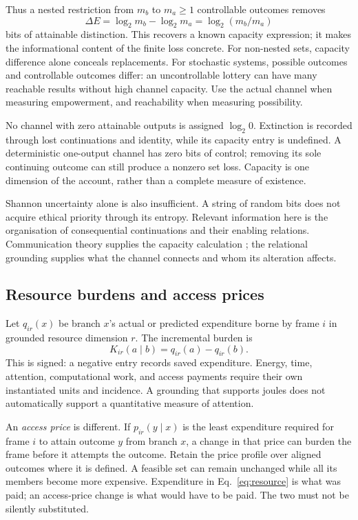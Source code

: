 \documentclass[11pt,a4paper]{article}
\theoremstyle{remark}
\begin{document}
Thus a nested restriction from $m_b$ to $m_a\geq1$ controllable outcomes removes
\begin{equation}\label{eq:bitloss}
\Delta E=\log_2m_b-\log_2m_a=\log_2(m_b/m_a)
\end{equation}
bits of attainable distinction. This recovers a known capacity expression; it
makes the informational content of the finite loss concrete. For non-nested
sets, capacity difference alone conceals replacements. For stochastic systems,
possible outcomes and controllable outcomes differ: an uncontrollable lottery
can have many reachable results without high channel capacity. Use the actual
channel when measuring empowerment, and reachability when measuring possibility.

No channel with zero attainable outputs is assigned $\log_2 0$. Extinction is
recorded through lost continuations and identity, while its capacity entry is
undefined. A deterministic one-output channel has zero bits of control; removing
its sole continuing outcome can still produce a nonzero set loss. Capacity is
one dimension of the account, rather than a complete measure of existence.

Shannon uncertainty alone is also insufficient. A string of random bits does
not acquire ethical priority through its entropy. Relevant information here is
the organisation of consequential continuations and their enabling relations.
Communication theory supplies the capacity calculation
\citep{shannon1948communication}; the relational grounding supplies what the
channel connects and whom its alteration affects.

\subsection{Resource burdens and access prices}

Let $q_{ir}(x)$ be branch $x$'s actual or predicted expenditure borne by frame
$i$ in grounded resource dimension $r$. The incremental burden is
\begin{equation}\label{eq:resource}
K_{ir}(a\mid b)=q_{ir}(a)-q_{ir}(b).
\end{equation}
This is signed: a negative entry records saved expenditure. Energy, time,
attention, computational work, and access payments require their own instantiated
units and incidence. A grounding that supports joules does not automatically
support a quantitative measure of attention.

An \emph{access price} is different. If $p_{ir}(y\mid x)$ is the least expenditure
required for frame $i$ to attain outcome $y$ from branch $x$, a change in that
price can burden the frame before it attempts the outcome. Retain the price
profile over aligned outcomes where it is defined. A feasible set can remain
unchanged while all its members become more expensive. Expenditure in
Eq.~\eqref{eq:resource} is what was paid; an access-price change is what would
have to be paid. The two must not be silently substituted.
\end{document}
